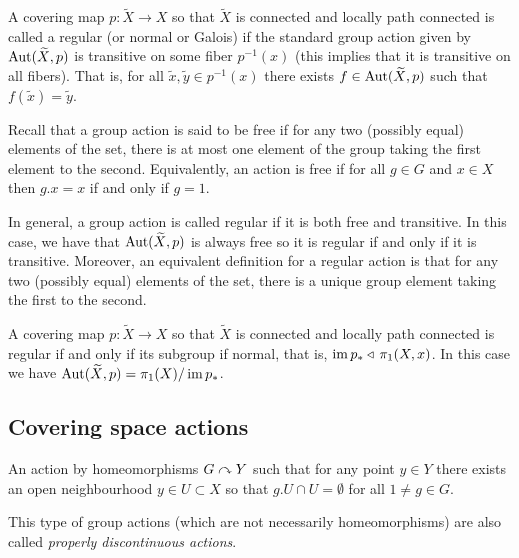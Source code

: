\documentclass[11pt,a4paper]{article}
\begin{document}
\begin{definition}
  A covering map $p \colon \widetilde X \to X$ so that
  $\widetilde X$ is connected and locally path connected
  is called a regular (or normal or Galois) if the standard
  group action given by $\operatorname{Aut}(\widetilde X, p)$ is transitive on some fiber
  $p^{-1}(x)$ (this implies that it is transitive on all fibers).
  That is, for all $\tilde x, \tilde y \in p^{-1}(x)$ there exists
  $f \in \operatorname{Aut}(\widetilde X, p)$ such that $f(\tilde x) = \tilde y$.
\end{definition}
\begin{remark}
  Recall that a group action is said to be free if for any two (possibly equal)
  elements of the set, there is at most one element of the group taking the
  first element to the second.
  Equivalently, an action is free if for all $g \in G$ and $x \in X$ then
  $g.x = x$ if and only if $g = 1$.
\end{remark}
\begin{remark}
  In general, a group action is called regular if it is both free and
  transitive.
  In this case, we have that $\operatorname{Aut}(\widetilde X, p)$ is always free so
  it is regular if and only if it is transitive.
  Moreover, an equivalent definition for a regular action is that
  for any two (possibly equal) elements of the set,
  there is a unique group element taking the first to the second.
\end{remark}

\begin{corollary}
  A covering map $p \colon \widetilde X \to X$ so that
  $\widetilde X$ is connected and locally path connected
  is regular if and only if its subgroup if normal, that is,
  $\operatorname{im} p_* \triangleleft\, \pi_1(X,x)$.
  In this case we have $\operatorname{Aut}(\widetilde X,p) = \pi_1(X) / \operatorname{im} p_*$.
\end{corollary}

\subsection{Covering space actions}
\begin{definition}
  An action by homeomorphisms $G \curvearrowright Y$ such that for any point $y \in Y$
  there exists an open neighbourhood $y \in U \subset X$ so that
  $g.U \cap U = \emptyset$ for all $1 \neq g \in G$.
\end{definition}
\begin{remark}
  This type of group actions (which are not necessarily homeomorphisms)
  are also called \textit{properly discontinuous actions}.
\end{remark}
\end{document}
